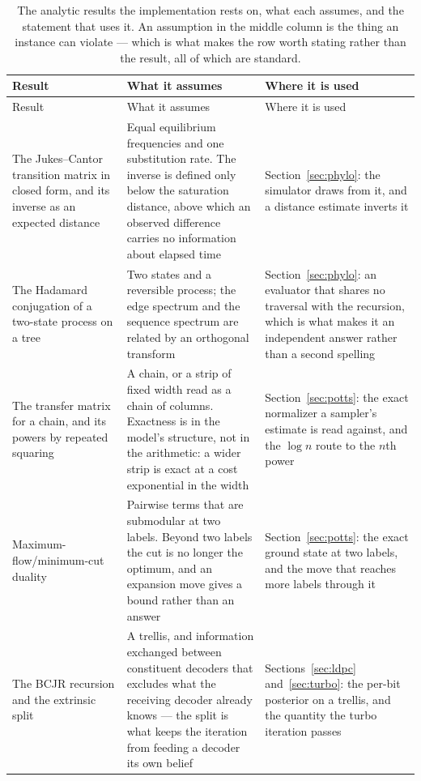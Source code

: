 \documentclass[11pt,a4paper]{article}
\begin{document}
\begin{longtable}{@{}p{}p{}p{}@{}}
  \caption{The analytic results the implementation rests on, what each
  assumes, and the statement that uses it. An assumption in the middle column
  is the thing an instance can violate --- which is what makes the row worth
  stating rather than the result, all of which are
  standard.}\label{tab:analytic-results}\\
  \toprule
  Result & What it assumes & Where it is used \\
  \midrule
  \endfirsthead
  \toprule
  Result & What it assumes & Where it is used \\
  \midrule
  \endhead
  \bottomrule
  \endfoot

  The Jukes--Cantor transition matrix in closed form, and its inverse as an
  expected distance
  & Equal equilibrium frequencies and one substitution rate. The inverse is
  defined only below the saturation distance, above which an observed
  difference carries no information about elapsed time
  & Section~\ref{sec:phylo}: the simulator draws from it, and a distance
  estimate inverts it \\

  The Hadamard conjugation of a two-state process on a tree
  & Two states and a reversible process; the edge spectrum and the sequence
  spectrum are related by an orthogonal transform
  & Section~\ref{sec:phylo}: an evaluator that shares no traversal with the
  recursion, which is what makes it an independent answer rather than a second
  spelling \\

  The transfer matrix for a chain, and its powers by repeated squaring
  & A chain, or a strip of fixed width read as a chain of columns. Exactness
  is in the model's structure, not in the arithmetic: a wider strip is exact
  at a cost exponential in the width
  & Section~\ref{sec:potts}: the exact normalizer a sampler's estimate is read
  against, and the $\log n$ route to the $n$th power \\

  Maximum-flow/minimum-cut duality
  & Pairwise terms that are submodular at two labels. Beyond two labels the
  cut is no longer the optimum, and an expansion move gives a bound rather
  than an answer
  & Section~\ref{sec:potts}: the exact ground state at two labels, and the
  move that reaches more labels through it \\

  The BCJR recursion and the extrinsic split
  & A trellis, and information exchanged between constituent decoders that
  excludes what the receiving decoder already knows --- the split is what
  keeps the iteration from feeding a decoder its own belief
  & Sections~\ref{sec:ldpc} and~\ref{sec:turbo}: the per-bit posterior on a
  trellis, and the quantity the turbo iteration passes \\


\end{longtable}
\end{document}
